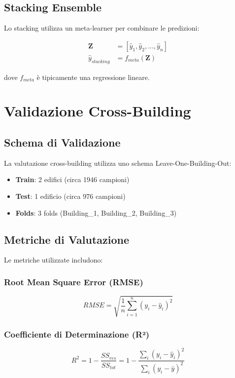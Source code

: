 \documentclass[12pt,a4paper,twoside]{report}
\begin{document}
\subsection{Stacking Ensemble}

Lo stacking utilizza un meta-learner per combinare le predizioni:

\begin{align}
\mathbf{Z} &= [\hat{y}_1, \hat{y}_2, ..., \hat{y}_n] \\
\hat{y}_{stacking} &= f_{meta}(\mathbf{Z})
\end{align}

dove $f_{meta}$ è tipicamente una regressione lineare.

\section{Validazione Cross-Building}

\subsection{Schema di Validazione}

La valutazione cross-building utilizza uno schema Leave-One-Building-Out:

\begin{itemize}
    \item \textbf{Train}: 2 edifici (circa 1946 campioni)
    \item \textbf{Test}: 1 edificio (circa 976 campioni)
    \item \textbf{Folds}: 3 folds (Building\_1, Building\_2, Building\_3)
\end{itemize}

\subsection{Metriche di Valutazione}

Le metriche utilizzate includono:

\subsubsection{Root Mean Square Error (RMSE)}
\begin{equation}
RMSE = \sqrt{\frac{1}{n} \sum_{i=1}^{n} (y_i - \hat{y}_i)^2}
\end{equation}

\subsubsection{Coefficiente di Determinazione (R²)}
\begin{equation}
R^2 = 1 - \frac{SS_{res}}{SS_{tot}} = 1 - \frac{\sum_{i}(y_i - \hat{y}_i)^2}{\sum_{i}(y_i - \bar{y})^2}
\end{equation}
\end{document}
